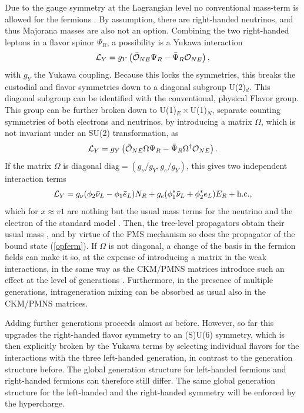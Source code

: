 \documentclass[final,12pt]{article}
\newcommand*{\La}{{\cal{L}}}
\newcommand*{\no}{\noindent}
\newcommand*{\be}{\begin{equation}}
\newcommand*{\ee}{\end{equation}}
\newcommand*{\pref}[1]{(\ref{#1})}
\newcommand*{\nn}{\nonumber}
\newcommand*{\diag}{\mathrm{diag}}
\newcommand*{\1}{1\!\!\!\bot}
\newcommand*{\op}{{\cal O}}
\begin{document}
Due to the gauge symmetry at the Lagrangian level no conventional mass-term is allowed for the fermions \cite{Bohm:2001yx}. By assumption, there are right-handed neutrinos, and thus Majorana masses are also not an option. Combining the two right-handed leptons in a flavor spinor $\Psi_R$, a possibility is a Yukawa interaction
\be
\La_Y=g_Y\left(\bar{\op}_{NE}\Psi_R-\bar{\Psi}_R\op_{NE}\right)\nn,
\ee
\no with $g_Y$ the Yukawa coupling. Because this locks the symmetries, this breaks the custodial and flavor symmetries down to a diagonal subgroup U(2)$_d$. This diagonal subgroup can be identified with the  conventional, physical Flavor group. This group can be further broken down to U(1)$_E\times$U(1)$_N$, separate counting symmetries of both electrons and neutrinos, by introducing a matrix $\Omega$, which is not invariant under an SU(2) transformation, as
\be
\La_Y=g_Y\left(\bar{\op}_{NE}\Omega\Psi_R-\bar{\Psi}_R\Omega^\dagger\op_{NE}\right)\label{yukawa}.
\ee
\no If the matrix $\Omega$ is diagonal $\diag=(g_\nu/g_Y,g_e/g_Y)$, this gives two independent interaction terms
\be
\La_Y=g_\nu(\phi_2\bar{\nu}_L-\phi_1 \bar{e}_L)N_R+g_e(\phi_1^*\bar{\nu}_L+\phi_2^*e_L)E_R+\text{h.c.}\nn,
\ee
\no which for $x\approx v1$ are nothing but the usual mass terms for the neutrino and the electron of the standard model \cite{Bohm:2001yx}. Then, the tree-level propagators obtain their usual mass \cite{Bohm:2001yx}, and by virtue of the FMS mechanism so does the propagator of the bound state \pref{opferm}. If $\Omega$ is not diagonal, a change of the basis in the fermion fields can make it so, at the expense of introducing a matrix in the weak interactions, in the same way as the CKM/PMNS matrices introduce such an effect at the level of generations \cite{Bohm:2001yx}. Furthermore, in the presence of multiple generations, intrageneration mixing can be absorbed as usual also in the CKM/PMNS matrices.

Adding further generations proceeds almost as before. However, so far this upgrades the right-handed flavor symmetry to an (S)U(6) symmetry, which is then explicitly broken by the Yukawa terms by selecting individual flavors for the interactions with the three left-handed generation, in contrast to the generation structure before. The global generation structure for left-handed fermions and right-handed fermions can therefore still differ. The same global generation structure for the left-handed and the right-handed symmetry will be enforced by the hypercharge.
\end{document}
